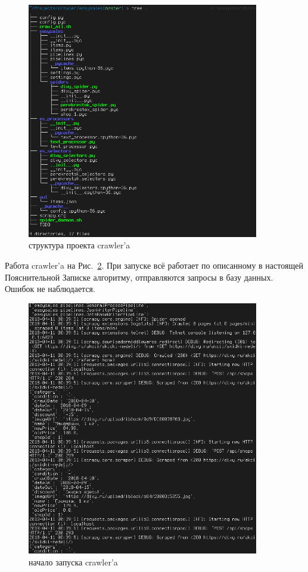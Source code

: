 \begin{figure}[h!]
    \centering
    \includegraphics[width=0.9\textwidth]{./screenshots/3/tree.png}
    \caption{\small{структура проекта crawler'a}}
    \label{tree}
\end{figure}

Работа crawler'a на Рис.~\ref{crawl_dixy}. При запуске всё работает по описанному
в настоящей Пояснительной Записке алгоритму, отправляются запросы в базу
данных. Ошибок не наблюдается.

\begin{figure}[h!]
    \centering
    \includegraphics[width=0.9\textwidth]{./screenshots/3/crawl_dixy.png}
    \caption{\small{начало запуска crawler'a}}
    \label{crawl_dixy}
\end{figure}


